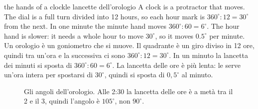 \begin{anchor}{the hands of a clock}{le lancette dell'orologio}
A clock is a protractor that moves. The dial is a full turn divided into 12 hours, so each hour mark is $360^\circ : 12 = 30^\circ$ from the next. In one minute the minute hand moves $360^\circ : 60 = 6^\circ$. The hour hand is slower: it needs a whole hour to move $30^\circ$, so it moves $0.5^\circ$ per minute.
\tcblower
Un orologio è un goniometro che si muove. Il quadrante è un giro diviso in 12 ore, quindi tra un'ora e la successiva ci sono $360^\circ : 12 = 30^\circ$. In un minuto la lancetta dei minuti si sposta di $360^\circ : 60 = 6^\circ$. La lancetta delle ore è più lenta: le serve un'ora intera per spostarsi di $30^\circ$, quindi si sposta di $0{,}5^\circ$ al minuto.
\end{anchor}

\begin{figure}[htbp]
\centering
%
      {Gli angoli dell'orologio. Alle 2:30 la lancetta delle ore è a metà tra il 2 e il 3, quindi l'angolo è $105^\circ$, non $90^\circ$.}
\label{fig:clocks}
\end{figure}

